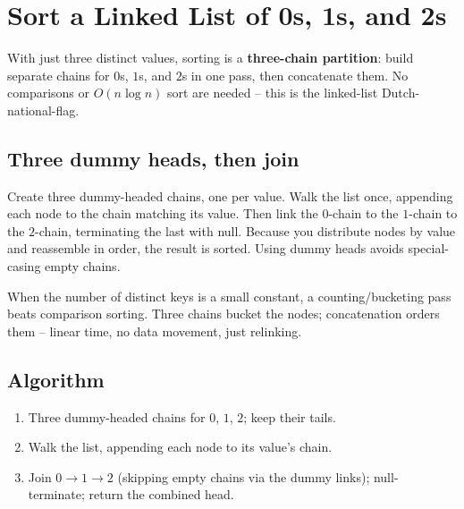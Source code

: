 \section{Sort a Linked List of 0s, 1s, and 2s}
\label{sec:ll-sort-012}


\begin{patternbox}
With just three distinct values, sorting is a \textbf{three-chain
partition}: build separate chains for $0$s, $1$s, and $2$s in one pass, then
concatenate them. No comparisons or $O(n\log n)$ sort are needed -- this is
the linked-list Dutch-national-flag.
\end{patternbox}

\subsection*{Three dummy heads, then join}

Create three dummy-headed chains, one per value. Walk the list once,
appending each node to the chain matching its value. Then link the $0$-chain
to the $1$-chain to the $2$-chain, terminating the last with null. Because
you distribute nodes by value and reassemble in order, the result is sorted.
Using dummy heads avoids special-casing empty chains.

\begin{ideabox}
When the number of distinct keys is a small constant, a counting/bucketing
pass beats comparison sorting. Three chains bucket the nodes; concatenation
orders them -- linear time, no data movement, just relinking.
\end{ideabox}

\subsection*{Algorithm}

\begin{enumerate}
  \item Three dummy-headed chains for $0$, $1$, $2$; keep their tails.
  \item Walk the list, appending each node to its value's chain.
  \item Join $0\to1\to2$ (skipping empty chains via the dummy links); null-
        terminate; return the combined head.
\end{enumerate}

